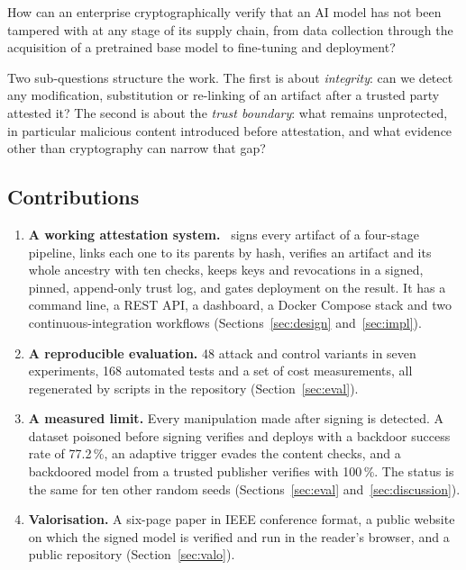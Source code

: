 \begin{keybox}
How can an enterprise cryptographically verify that an AI model has not been tampered with at any stage of its
supply chain, from data collection through the acquisition of a pretrained base model to fine-tuning and
deployment?
\end{keybox}

Two sub-questions structure the work. The first is about \emph{integrity}: can we detect any modification,
substitution or re-linking of an artifact after a trusted party attested it? The second is about the
\emph{trust boundary}: what remains unprotected, in particular malicious content introduced before attestation,
and what evidence other than cryptography can narrow that gap?

\subsection{Contributions}
\begin{enumerate}
\item \textbf{A working attestation system.} \sys\ signs every artifact of a four-stage pipeline, links each
  one to its parents by hash, verifies an artifact and its whole ancestry with ten checks, keeps keys and
  revocations in a signed, pinned, append-only trust log, and gates deployment on the result. It has a command
  line, a REST API, a dashboard, a Docker Compose stack and two continuous-integration workflows
  (Sections~\ref{sec:design} and~\ref{sec:impl}).
\item \textbf{A reproducible evaluation.} 48 attack and control variants in seven experiments, 168 automated
  tests and a set of cost measurements, all regenerated by scripts in the repository
  (Section~\ref{sec:eval}).
\item \textbf{A measured limit.} Every manipulation made after signing is detected. A dataset poisoned before
  signing verifies and deploys with a backdoor success rate of 77.2\,\%, an adaptive trigger evades the content
  checks, and a backdoored model from a trusted publisher verifies with 100\,\%. The status is the same for ten
  other random seeds (Sections~\ref{sec:eval} and~\ref{sec:discussion}).
\item \textbf{Valorisation.} A six-page paper in IEEE conference format, a public website on which the signed
  model is verified and run in the reader's browser, and a public repository (Section~\ref{sec:valo}).
\end{enumerate}

